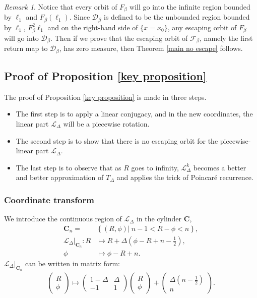 \documentclass{article}
\numberwithin{figure}{section}
\numberwithin{equation}{section}
\theoremstyle{remark}
\newtheorem*{remark}{Remark}
\theoremstyle{definition}
\begin{document}
 \begin{remark}
	Notice that every orbit of $F_\beta$ will go into the infinite region bounded by $\ell_1$ and $F_\beta\left(\ell_1\right)$. Since \(\mathcal{D}_\beta\) is defined to be the unbounded region bounded by \(\ell_{1}\), \(F_\beta^{2}\ell_{1}\)
and on the right-hand side of \(\{ x = x_{0}\}\), any escaping orbit of $F_\beta$ will go into \(\mathcal{D}_\beta\). Then if we prove that the escaping orbit of $\mathcal{F}_\beta$, namely the first return map to \(\mathcal{D}_\beta\), has zero measure, then Theorem \ref{main no escape} follows.
\end{remark}



\subsection{Proof of Proposition \ref{key proposition}}
The proof of Proposition \ref{key proposition} is made in three steps. 
\begin{itemize}
    \item The first step is to apply a linear conjugacy, and in the new coordinates, the linear part $\mathcal{L}_\Delta$ will be a piecewise rotation.
    \item The second step is to show that there is no escaping orbit for the piecewise-linear part $\mathcal{L}_\Delta$. 
    \item The last step is to observe that as $R$ goes to infinity, $\mathcal{L}_\Delta^k$ becomes a better and better approximation of $T_\Delta$ and applies the trick of Poincar{\' e} recurrence.  
\end{itemize}


\subsubsection{Coordinate transform}
We introduce the continuous region of $\mathcal{L}_\Delta$ in the cylinder $\textbf{C}$,  
\begin{align*}
	\textbf{C}_n=&\left\{(R,\phi)|\ n-1<R-\phi<n\right\},\\
	\mathcal{L}_\Delta|_{\textbf{C}_n}:R& \mapsto R+\Delta\left(\phi-R+n-\frac{1}{2}\right),\\
	\phi& \mapsto \phi-R+n.
\end{align*}
$\mathcal{L}_\Delta|_{\textbf{C}_n}$ can be written in matrix form:
\begin{align*}
	\begin{pmatrix}
		R\\
		\phi
	\end{pmatrix}
	\mapsto
	\begin{pmatrix}
		1-\Delta&\Delta\\
		-1&1
	\end{pmatrix}
	\begin{pmatrix}
		R\\
		\phi
	\end{pmatrix}
	+
	\begin{pmatrix}
		\Delta\left(n-\frac{1}{2}\right)\\
		n
	\end{pmatrix}.
\end{align*}
\end{document}
